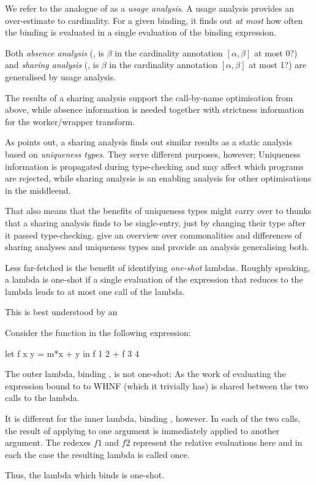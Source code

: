 We refer to the analogue of \MaxCard as a \emph{usage analysis}.
A usage analysis provides an over-estimate to cardinality.
For a given binding, it finds out \emph{at most} how often the binding is evaluated in a single evaluation of the binding expression.

Both \emph{absence analysis} (\eg, is $\beta$ in the cardinality annotation $[\alpha, \beta]$ at most 0?) and \emph{sharing analysis} (\eg, is $\beta$ in the cardinality annotation $[\alpha, \beta]$ at most 1?) are generalised by usage analysis.

The results of a sharing analysis support the call-by-name optimisation from above, while absence information is needed together with strictness information for the worker/wrapper transform.

As \textcite[section~2.4]{verstoep} points out, a sharing analysis finds out similar results as a static analysis based on \emph{uniqueness types}.
They serve different purposes, however; Uniqueness information is propagated during type-checking and may affect which programs are rejected, while sharing analysis is an enabling analysis for other optimisations in the middleend.

That also means that the benefits of uniqueness types might carry over to thunks that a sharing analysis finds to be single-entry, just by changing their type after it passed type-checking.
\textcite{sharing} give an overview over commonalities and differences of sharing analyses and uniqueness types and provide an analysis generalising both.

Less far-fetched is the benefit of identifying \emph{one-shot} lambdas.
Roughly speaking, a lambda is one-shot if a single evaluation of the expression that reduces to the lambda leads to at most one call of the lambda.

This is best understood by an

\begin{example}
  Consider the function  in the following expression:
  \begin{haskellcode}
    let f x y = m*x + y
    in f 1 2 + f 3 4
  \end{haskellcode}

  The outer lambda, binding , is not one-shot:
  As the work of evaluating the expression bound to  to WHNF (which it trivially has) is shared between the two calls to the lambda.

  It is different for the inner lambda, binding , however.
  In each of the two calls, the result of applying  to one argument is immediately applied to another argument. The redexes $f 1$ and $f 2$ represent the relative evaluations here and in each the case the resulting lambda is called once.
  
  Thus, the lambda which binds  is one-shot.
\end{example}

